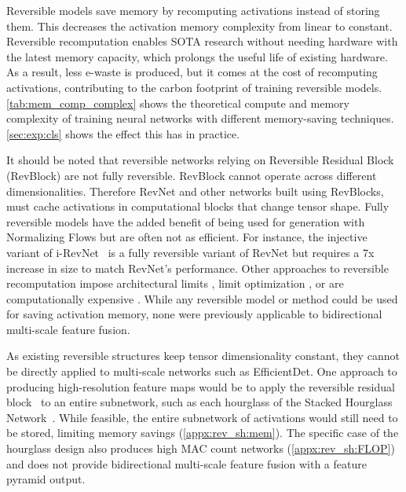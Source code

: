 \documentclass{article}
\begin{document}
Reversible models \cite{gomez2017reversible, mackay2018reversible, brugger2019partially, pendse2020memory, yamazaki2021invertible, sander2021momentum, chun2020momentum, kitaev2020reformer, nestler2021homebrewnlp} save memory by recomputing activations instead of storing them.
This decreases the activation memory complexity from linear to constant.
Reversible recomputation enables SOTA research without needing hardware with the latest memory capacity, which prolongs the useful life of existing hardware.
As a result, less e-waste is produced, but it comes at the cost of recomputing activations, contributing to the carbon footprint of training reversible models.
\cref{tab:mem_comp_complex} shows the theoretical compute and memory complexity of training neural networks with different memory-saving techniques.
\cref{sec:exp:cls} shows the effect this has in practice.

It should be noted that reversible networks relying on Reversible Residual Block (RevBlock) \cite{gomez2017reversible} are not fully reversible.
RevBlock cannot operate across different dimensionalities. Therefore RevNet \cite{gomez2017reversible} and other networks built using RevBlocks, must cache activations in computational blocks that change tensor shape.
Fully reversible models have the added benefit of being used for generation with Normalizing Flows \cite{dinh2014nice, germain2015made, dinh2016density, kingma2016improved, papamakarios2017masked, kingma2018glow, huang2018neural, jacobsen2018irevnet, keller2021self} but are often not as efficient.
For instance, the injective variant of i-RevNet~\cite{jacobsen2018irevnet} is a fully reversible variant of RevNet but requires a 7x increase in size to match RevNet's performance.
Other approaches to reversible recomputation impose architectural limits \cite{bai2019deep}, limit optimization \cite{behrmann2019invertible, thangarasa2019reversible}, or are computationally expensive \cite{behrmann2019invertible}.
While any reversible model or method could be used for saving activation memory, none were previously applicable to bidirectional multi-scale feature fusion.

As existing reversible structures keep tensor dimensionality constant, they cannot be directly applied to multi-scale networks such as EfficientDet.
One approach to producing high-resolution feature maps would be to apply the reversible residual block~\cite{gomez2017reversible} to an entire subnetwork, such as each hourglass of the Stacked Hourglass Network~\cite{newell2016stacked}.
While feasible, the entire subnetwork of activations would still need to be stored, limiting memory savings (\cref{appx:rev_sh:mem}).
The specific case of the hourglass design also produces high MAC count networks (\cref{appx:rev_sh:FLOP}) and does not provide bidirectional multi-scale feature fusion with a feature pyramid output.
\end{document}
